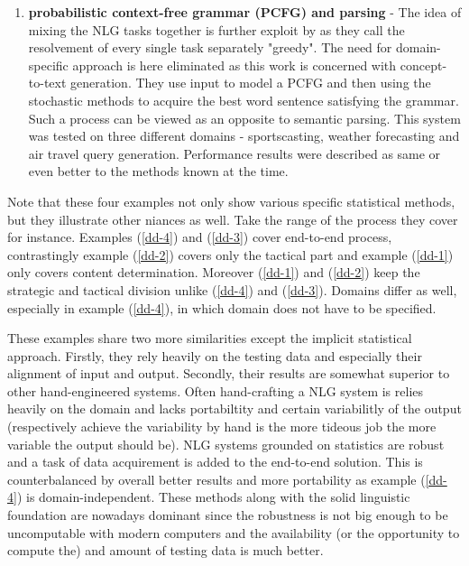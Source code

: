 \begin{enumerate}
	\item \textbf{probabilistic context-free grammar (PCFG) and parsing} - The idea of mixing the NLG tasks together is further exploit by \cite{konstas2013global} as they call the resolvement of every single task separately "greedy". The need for domain-specific approach is here eliminated as this work is concerned with concept-to-text generation. They use input to model a PCFG and then using the stochastic methods to acquire the best word sentence satisfying the grammar. Such a process can be viewed as an opposite to semantic parsing. This system was tested on three different domains - sportscasting, weather forecasting and air travel query generation. Performance results were described as same or even better to the methods known at the time.\label{dd-4}
\end{enumerate}
Note that these four examples not only show various specific statistical methods, but they illustrate other niances as well. Take the range of the process they cover for instance. Examples (\ref{dd-4}) and (\ref{dd-3}) cover end-to-end process, contrastingly example (\ref{dd-2}) covers only the tactical part and example (\ref{dd-1}) only covers content determination. Moreover (\ref{dd-1}) and (\ref{dd-2}) keep the strategic and tactical division unlike (\ref{dd-4}) and (\ref{dd-3}). Domains differ as well, especially in example (\ref{dd-4}), in which domain does not have to be specified.

These examples share two more similarities except the implicit statistical approach. Firstly, they rely heavily on the testing data and especially their alignment of input and output. Secondly, their results are somewhat superior to other hand-engineered systems. Often hand-crafting a NLG system is relies heavily on the domain and lacks portabiltity and certain variabilitly of the output (respectively achieve the variability by hand is the more tideous job the more variable the output should be). NLG systems grounded on statistics are robust and a task of data acquirement is added to the end-to-end solution. This is counterbalanced by overall better results and more portability as example (\ref{dd-4}) is domain-independent. These methods along with the solid linguistic foundation are nowadays dominant since the robustness is not big enough to be uncomputable with modern computers and the availability (or the opportunity to compute the) and amount of testing data is much better. 